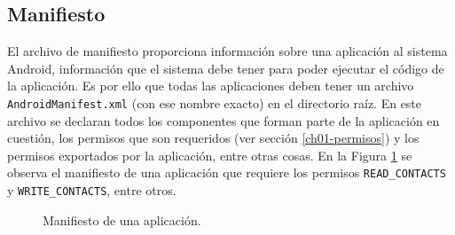 \subsection{Manifiesto}
El archivo de manifiesto proporciona información sobre una aplicación al sistema Android, información que el sistema debe tener para poder ejecutar el código de la aplicación. Es por ello que todas las aplicaciones deben tener un archivo \texttt{AndroidManifest.xml} (con ese nombre exacto) en el directorio raíz. En este archivo se declaran todos los componentes que forman parte de la aplicación en cuestión, los permisos que son requeridos (ver sección \ref{ch01-permisos}) y los permisos exportados por la aplicación, entre otras cosas. En la Figura \ref{fig:ch01:manifest} se observa el manifiesto de una aplicación que requiere los permisos \texttt{READ\_CONTACTS} y \texttt{WRITE\_CONTACTS}, entre otros.
\begin{figure}[tbp]
    \centering
    
    \caption{Manifiesto de una aplicación.}
    \label{fig:ch01:manifest}
\end{figure}